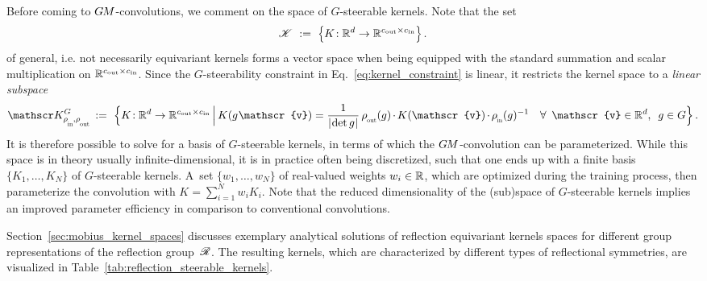 Before coming to $G\mkern-1.4muM$-convolutions, we comment on the space of $G$-steerable kernels.
Note that the set
\begin{align}\label{eq:unconstrained_kernel_space}
    \mathscr{K}\ :=\ \pig\{ K\!: \R^d \to \R^{\cout\times\cin} \pig\} \,.
\end{align}
of general, i.e. not necessarily equivariant kernels forms a vector space when being equipped with the standard summation and scalar multiplication on $\mathbb{R}^{{c_\textup{out}}\times{c_\textup{in}}}$.
Since the $G$-steerability constraint in Eq.~\eqref{eq:kernel_constraint} is linear, it restricts the kernel space to a \emph{linear subspace}
\begin{align}\label{eq:G-steerable_kernel_space}
    \KG\, :=\ \Big\{ K\!: \R^d \to \R^{\cout\times\cin} \,\Big|\,
    K(g\mkern1mu \mathscr{v}) = \frac{1}{\detg}\, \rhoout(g) \mkern-1.5mu\cdot\mkern-1.5mu K(\mathscr{v}) \mkern-1.5mu\cdot\mkern-1.5mu \rhoin(g)^{-1} \ \ \ \forall\,\ \mathscr{v}\in \R^d,\,\ g\in G \Big\} \,.
\end{align}
It is therefore possible to solve for a basis of $G$-steerable kernels, in terms of which the $G\mkern-1.4muM$-convolution can be parameterized.
While this space is in theory usually infinite-dimensional, it is in practice often being discretized, such that one ends up with a finite basis $\{K_1,\dots,K_N\}$ of $G$-steerable kernels.
A~set $\{w_1,\dots,w_N\}$ of real-valued weights $w_i\in\mathbb{R}$, which are optimized during the training process, then parameterize the convolution with $K = \sum_{i=1}^N w_i K_i$.
Note that the reduced dimensionality of the (sub)space of $G$-steerable kernels implies an improved parameter efficiency in comparison to conventional convolutions.


Section~\ref{sec:mobius_kernel_spaces} discusses exemplary analytical solutions of reflection equivariant kernels spaces for different group representations of the reflection group~$\mathscr{R}$.
The resulting kernels, which are characterized by different types of reflectional symmetries, are visualized in Table~\ref{tab:reflection_steerable_kernels}.


